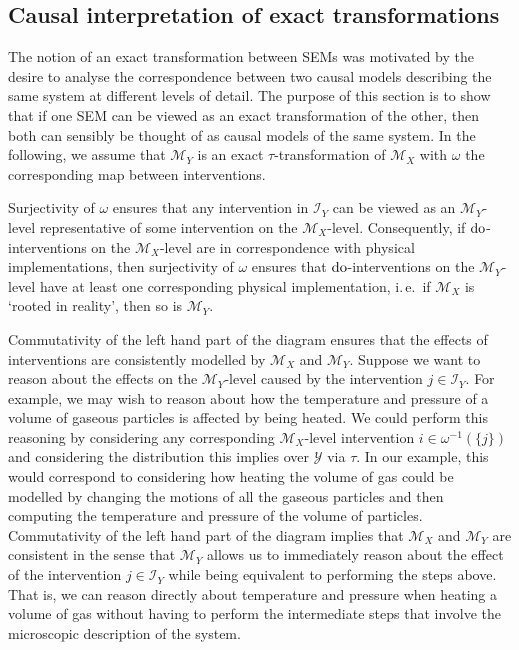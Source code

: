 \subsection{Causal interpretation of exact transformations}
The notion of an exact transformation between SEMs was motivated by the desire to analyse the correspondence between two causal models describing the same system at different levels of detail.
The purpose of this section is to show that if one SEM can be viewed as an exact transformation of the other, then both can sensibly be thought of as causal models of the same system. In the following, we assume that $\mathcal{M}_Y$ is an exact $\tau$-transformation of $\mathcal{M}_X$ with $\omega$ the corresponding map between interventions.

Surjectivity of $\omega$ ensures that any intervention in $\mathcal{I}_Y$ can be viewed as an $\mathcal{M}_Y$-level representative of some intervention on the $\mathcal{M}_X$-level. Consequently, if $\operatorname{do}$-interventions on the $\mathcal{M}_X$-level are in correspondence with physical implementations, then surjectivity of $\omega$ ensures that $\operatorname{do}$-interventions on the $\mathcal{M}_Y$-level have at least one corresponding physical implementation, i.\,e.\ if $\mathcal{M}_X$ is `rooted in reality', then so is $\mathcal{M}_Y$.

Commutativity of the left hand part of the diagram ensures that the effects of interventions are consistently modelled by $\mathcal{M}_X$ and $\mathcal{M}_Y$.
Suppose we want to reason about the effects on the $\mathcal{M}_Y$-level caused by the intervention $j \in \mathcal{I}_Y$.
For example, we may wish to reason about how the temperature and pressure of a volume of gaseous particles is affected by being heated.
We could perform this reasoning by considering any corresponding $\mathcal{M}_X$-level intervention $i \in \omega^{-1}(\{j\})$ and considering the distribution this implies over $\mathcal{Y}$ via $\tau$.
In our example, this would correspond to considering how heating the volume of gas could be modelled by changing the motions of all the gaseous particles and then computing the temperature and pressure of the volume of particles.
Commutativity of the left hand part of the diagram implies that $\mathcal{M}_X$ and $\mathcal{M}_Y$ are consistent in the sense that $\mathcal{M}_Y$ allows us to immediately reason about the effect of the intervention $j\in\mathcal{I}_Y$ while being equivalent to performing the steps above.
That is, we can reason directly about temperature and pressure when heating a volume of gas without having to perform the intermediate steps that involve the microscopic description of the system.

